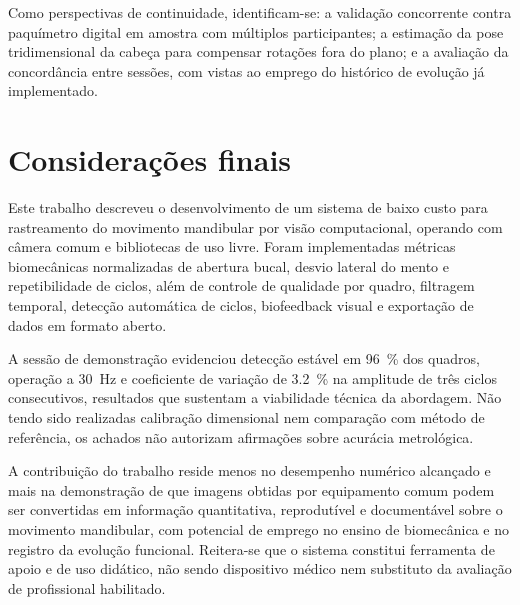 \documentclass[
    article,
    11pt,
    oneside,
    a4paper,
    english,
    brazil
]{abntex2}
\begin{document}
Como perspectivas de continuidade, identificam-se: a validação concorrente
contra paquímetro digital em amostra com múltiplos participantes; a
estimação da pose tridimensional da cabeça para compensar rotações fora do
plano; e a avaliação da concordância entre sessões, com vistas ao emprego do
histórico de evolução já implementado.

\section{Considerações finais}

Este trabalho descreveu o desenvolvimento de um sistema de baixo custo para
rastreamento do movimento mandibular por visão computacional, operando com
câmera comum e bibliotecas de uso livre. Foram implementadas métricas
biomecânicas normalizadas de abertura bucal, desvio lateral do mento e
repetibilidade de ciclos, além de controle de qualidade por quadro,
filtragem temporal, detecção automática de ciclos, biofeedback visual e
exportação de dados em formato aberto.

A sessão de demonstração evidenciou detecção estável em \SI{96}{\percent}
dos quadros, operação a \SI{30}{\hertz} e coeficiente de variação de
\SI{3,2}{\percent} na amplitude de três ciclos consecutivos, resultados que
sustentam a viabilidade técnica da abordagem. Não tendo sido realizadas
calibração dimensional nem comparação com método de referência, os achados
não autorizam afirmações sobre acurácia metrológica.

A contribuição do trabalho reside menos no desempenho numérico alcançado e
mais na demonstração de que imagens obtidas por equipamento comum podem ser
convertidas em informação quantitativa, reprodutível e documentável sobre o
movimento mandibular, com potencial de emprego no ensino de biomecânica e no
registro da evolução funcional. Reitera-se que o sistema constitui
ferramenta de apoio e de uso didático, não sendo dispositivo médico nem
substituto da avaliação de profissional habilitado.


\end{document}
